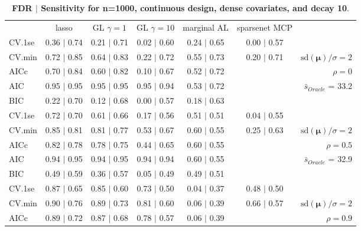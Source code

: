 \begin{table}\vspace{-.5cm}
\caption[l]{ {\it }
{ \bf FDR $\boldsymbol{\mid}$ Sensitivity for n=1000, continuous design, dense covariates, and  decay  10}.}
\vspace{-.5cm}
\footnotesize{}
\begin{center}
\begin{tabular}{l*{5}{c}|r}
 & lasso & GL $\gamma=1$ & GL $\gamma=10$ & marginal AL & sparsenet MCP  & \\
 \cline{1-7}
CV.1se & 0.36 $\mid$ 0.74 & 0.21 $\mid$ 0.71 & 0.02 $\mid$ 0.60 & 0.24 $\mid$ 0.65 & 0.00 $\mid$ 0.57 & \\
CV.min & 0.72 $\mid$ 0.85 & 0.64 $\mid$ 0.83 & 0.22 $\mid$ 0.72 & 0.55 $\mid$ 0.73 & 0.20 $\mid$ 0.71 &  $\mathrm{sd}(\mathbf{\mu})/\sigma=2$ \\
AICc & 0.70 $\mid$ 0.84 & 0.60 $\mid$ 0.82 & 0.10 $\mid$ 0.67 & 0.52 $\mid$ 0.72 & & $\rho=0$ \\
AIC & 0.95 $\mid$ 0.95 & 0.95 $\mid$ 0.95 & 0.95 $\mid$ 0.94 & 0.53 $\mid$ 0.72 & &  \multirow{2}{*}{$\bar{s}_{Oracle}$ = 33.2} \\
BIC & 0.22 $\mid$ 0.70 & 0.12 $\mid$ 0.68 & 0.00 $\mid$ 0.57 & 0.18 $\mid$ 0.63 & &  \\
 \hline 
CV.1se & 0.72 $\mid$ 0.70 & 0.61 $\mid$ 0.66 & 0.17 $\mid$ 0.56 & 0.51 $\mid$ 0.51 & 0.04 $\mid$ 0.55 & \\
CV.min & 0.85 $\mid$ 0.81 & 0.81 $\mid$ 0.77 & 0.53 $\mid$ 0.67 & 0.60 $\mid$ 0.55 & 0.25 $\mid$ 0.63 &  $\mathrm{sd}(\mathbf{\mu})/\sigma=2$ \\
AICc & 0.82 $\mid$ 0.78 & 0.78 $\mid$ 0.75 & 0.44 $\mid$ 0.65 & 0.60 $\mid$ 0.55 & & $\rho=0.5$ \\
AIC & 0.94 $\mid$ 0.95 & 0.94 $\mid$ 0.95 & 0.94 $\mid$ 0.94 & 0.60 $\mid$ 0.55 & &  \multirow{2}{*}{$\bar{s}_{Oracle}$ = 32.9} \\
BIC & 0.49 $\mid$ 0.59 & 0.36 $\mid$ 0.57 & 0.05 $\mid$ 0.49 & 0.49 $\mid$ 0.51 & &  \\
 \hline 
CV.1se & 0.87 $\mid$ 0.65 & 0.85 $\mid$ 0.60 & 0.73 $\mid$ 0.50 & 0.04 $\mid$ 0.37 & 0.48 $\mid$ 0.50 & \\
CV.min & 0.90 $\mid$ 0.76 & 0.89 $\mid$ 0.73 & 0.81 $\mid$ 0.60 & 0.06 $\mid$ 0.39 & 0.66 $\mid$ 0.57 &  $\mathrm{sd}(\mathbf{\mu})/\sigma=2$ \\
AICc & 0.89 $\mid$ 0.72 & 0.87 $\mid$ 0.68 & 0.78 $\mid$ 0.57 & 0.06 $\mid$ 0.39 & & $\rho=0.9$ \\

\end{tabular}
\end{center}
\end{table}
